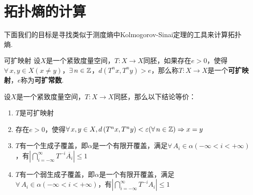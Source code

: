\section{拓扑熵的计算}

下面我们的目标是寻找类似于测度熵中Kolmogorov-Sinai定理的工具来计算拓扑熵.\par
\begin{definition}{可扩映射}
    设$X$是一个紧致度量空间，$T:X\to X$同胚，如果存在$e>0$，使得$\forall\, x,y\in X(x\neq y)$，$\exists\, n\in\mathbb{Z}$，$d(T^nx,T^ny)>e$，那么称$T:X\to X$是一个\textbf{可扩映射}，$e$称为\textbf{可扩常数}.
\end{definition}
\begin{theorem}{}
    设$X$是一个紧致度量空间，$T:X\to X$同胚，那么以下结论等价：
    \begin{enumerate}[(1)]
        \item $T$是可扩映射
        \item 存在$e>0$，使得$\forall\, x,y\in X,d\left(T^nx,T^ny\right)<\varepsilon(\forall\, n\in\mathbb{Z})\Rightarrow x=y$
        \item $T$有一个生成子覆盖，即$\alpha$是一个有限开覆盖，满足$\forall\, A_i\in\alpha(-\infty<i<+\infty)$，有$\left|\bigcap_{i=-\infty}^\infty{T^{-i}\overline{A_i}}\right|\leq 1$
        \item $T$有一个弱生成子覆盖，即$\alpha$是一个有限开覆盖，满足$\forall\, A_i\in\alpha(-\infty<i<+\infty)$，有$\left|\bigcap_{i=-\infty}^\infty{T^{-i}{A_i}}\right|\leq 1$
    \end{enumerate}
\end{theorem}
